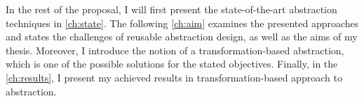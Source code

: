 In the rest of the proposal, I will first present the state-of-the-art
abstraction techniques in \autoref{ch:state}.  The following \autoref{ch:aim}
examines the presented approaches and states the challenges of reusable
abstraction design, as well as the aims of my thesis. Moreover, I
introduce the notion of a transformation-based abstraction, which is one of the
possible solutions for the stated objectives. Finally, in the
\autoref{ch:results}, I present my achieved results in transformation-based
approach to abstraction.
